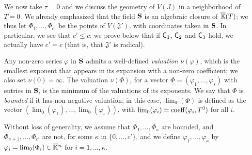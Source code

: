 \documentclass[12pt]{article}
\begin{document}
We now take $\tau=0$ and we discuss the geometry of $V(J)$ in a
neighborhood of $T=0$.  We already emphasized that the field $\mathbf{S}$ is an
algebraic closure of $\overline{\mathbb{K}}(T)$; we thus let $\Phi_1,\dots,\Phi_{c'}$
be the points of $V(\mathfrak{J}')$, with coordinates taken in
$\mathbf{S}$. In particular, we see that $c' \le c$; we prove below that if
$\mathsf{C}_1$, $\mathsf{C}_2$ and $\mathsf{C}_3$ hold, we actually have $c'=c$ (that
is, that $\mathfrak{J}'$ is radical).

Any non-zero series $\varphi$ in $\mathbf{S}$ admits a well-defined {\em
  valuation} $\nu(\varphi)$, which is the smallest exponent that
appears in its expansion with a non-zero coefficient; we also set
$\nu(0)=\infty$. The valuation $\nu(\Phi)$, for a vector
$\Phi=(\varphi_1,\dots,\varphi_s)$ with entries in $\mathbf{S}$, is the
minimum of the valuations of its exponents. We say that $\Phi$ is {\em
  bounded} if it has non-negative valuation; in this case,
$\lim_0(\Phi)$ is defined as the vector
$(\lim_0(\varphi_1),\dots,\lim_0(\varphi_s))$, with
$\lim_0(\varphi_i)={\rm coeff}(\varphi_i,T^0)$ for all $i$.

Without loss of generality, we assume that
$\Phi_1,\dots,\Phi_\kappa$ are bounded, and
$\Phi_{\kappa+1},\dots,\Phi_{c'}$ are not, for some $\kappa$ in
$\{0,\dots,c'\}$, and we define $\varphi_1,\dots,\varphi_\kappa$ by
$\varphi_i=\lim_0(\Phi_i)\in\overline{\mathbb{K}}{}^n$ for
$i=1,\dots,\kappa$.
\end{document}
